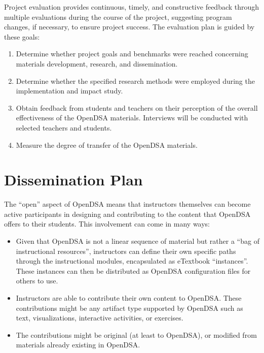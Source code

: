 \documentclass[11pt]{article}
\begin{document}
Project evaluation provides continuous, timely, and constructive
feedback through multiple evaluations during the course of the
project, suggesting program changes, if necessary, to ensure
project success.
The evaluation plan is guided by these goals:
\begin{enumerate}
\itemsep=0pt
\parskip=0pt
\parsep=0pt
\vspace{-\medskipamount}

\item Determine whether project goals and benchmarks were
reached concerning materials development, research, and
dissemination.
\item Determine whether the specified research methods were employed
  during the implementation and impact study.
\item Obtain feedback from students and teachers on their
perception of the overall effectiveness of the OpenDSA materials.
Interviews will be conducted with selected teachers and students.
\item Measure the degree of transfer of the OpenDSA materials.
\end{enumerate}

\section{Dissemination Plan}
\label{DissemSec}

The ``open'' aspect of OpenDSA means that instructors themselves
can become active participants in designing and contributing to the
content that OpenDSA offers to their students.
This involvement can come in many ways:

\begin{itemize}
\itemsep=0pt
\parskip=0pt
\parsep=0pt
\vspace{-\bigskipamount}

\item Given that OpenDSA is not a linear sequence of material but
rather a ``bag of instructional resources'', instructors can
define their own specific paths through the instructional modules,
encapsulated as eTextbook ``instances''.
These instances can then be distributed as OpenDSA configuration files
for others to use.

\item Instructors are able to contribute their
own content to OpenDSA.
These contributions might be any artifact type supported by OpenDSA
such as text, visualizations, interactive activities, or exercises.
  
\item The contributions might be original (at least to OpenDSA),
or modified from materials already existing in OpenDSA.
\end{itemize}
\end{document}
